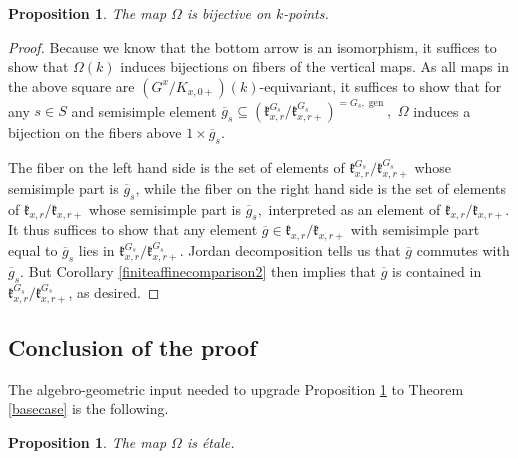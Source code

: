 \documentclass[12pt]{article}
\newcommand{\on}{\operatorname}
\newtheorem{proposition}[theorem]{Proposition}
\theoremstyle{remark}
\begin{document}
\begin{proposition}\label{bijectivity}
The map $\Omega$ is bijective on $k$-points.
\end{proposition}

\begin{proof}
Because we know that the bottom arrow is an isomorphism, it suffices to show that $\Omega(k)$ induces bijections on fibers of the vertical maps. As all maps in the above square are $(G^x/K_{x,0+})(k)$-equivariant, it suffices to show that for any $s\in S$ and semisimple element $\overline{g}_s\subseteq(\mathfrak{k}_{x,r}^{G_s}/\mathfrak{k}_{x,r+}^{G_s})^{=G_s,\on{gen}},$ $\Omega$ induces a bijection on the fibers above $1\times\overline{g}_s.$ 

The fiber on the left hand side is the set of elements of $\mathfrak{k}_{x,r}^{G_s}/\mathfrak{k}_{x,r+}^{G_s}$ whose semisimple part is $\overline{g}_s$, while the fiber on the right hand side is the set of elements of $\mathfrak{k}_{x,r}/\mathfrak{k}_{x,r+}$ whose semisimple part is $\overline{g}_s,$ interpreted as an element of $\mathfrak{k}_{x,r}/\mathfrak{k}_{x,r+}.$ It thus suffices to show that any element $\overline{g}\in\mathfrak{k}_{x,r}/\mathfrak{k}_{x,r+}$ with semisimple part equal to $\overline{g}_s$ lies in $\mathfrak{k}_{x,r}^{G_s}/\mathfrak{k}_{x,r+}^{G_s}$. Jordan decomposition tells us that $\overline{g}$ commutes with $\overline{g}_s$. But Corollary \ref{finiteaffinecomparison2} then implies that $\overline{g}$ is contained in $\mathfrak{k}_{x,r}^{G_s}/\mathfrak{k}_{x,r+}^{G_s}$, as desired.
\end{proof}

\subsection{Conclusion of the proof}

The algebro-geometric input needed to upgrade Proposition \ref{bijectivity} to Theorem \ref{basecase} is the following.

\begin{proposition}\label{omegaetale}
The map $\Omega$ is \'etale.
\end{proposition}
\end{document}
